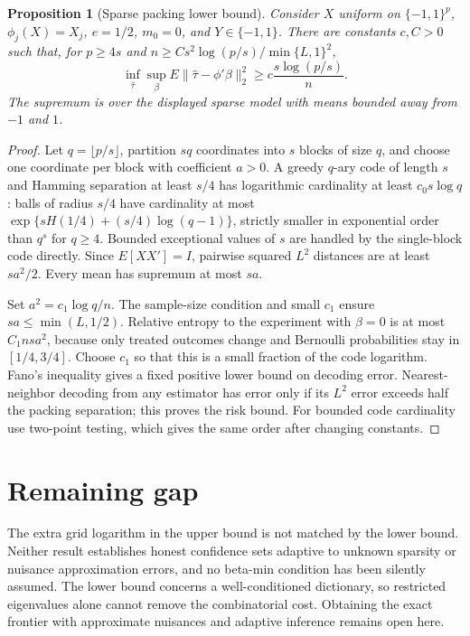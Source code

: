 \documentclass[11pt]{article}
\newtheorem{proposition}[theorem]{Proposition}
\theoremstyle{remark}
\begin{document}
\begin{proposition}[Sparse packing lower bound]
Consider $X$ uniform on $\{-1,1\}^p$, $\phi_j(X)=X_j$, $e=1/2$, $m_0=0$, and $Y\in\{-1,1\}$. There are constants $c,C>0$ such that, for $p\ge4s$ and
$n\ge C s^2\log(p/s)/\min\{L,1\}^2$,
\[
 \inf_{\widehat\tau}\sup_{\beta}
 E\|\widehat\tau-\phi'\beta\|_2^2
 \ge c\frac{s\log(p/s)}n.
\]
The supremum is over the displayed sparse model with means bounded away from $-1$ and $1$.
\end{proposition}
\begin{proof}
Let $q=\lfloor p/s\rfloor$, partition $sq$ coordinates into $s$ blocks of size $q$, and choose one coordinate per block with coefficient $a>0$. A greedy $q$-ary code of length $s$ and Hamming separation at least $s/4$ has logarithmic cardinality at least $c_0s\log q$: balls of radius $s/4$ have cardinality at most $\exp\{sH(1/4)+(s/4)\log(q-1)\}$, strictly smaller in exponential order than $q^s$ for $q\ge4$. Bounded exceptional values of $s$ are handled by the single-block code directly. Since $E[XX']=I$, pairwise squared $L^2$ distances are at least $sa^2/2$. Every mean has supremum at most $sa$.

Set $a^2=c_1\log q/n$. The sample-size condition and small $c_1$ ensure $sa\le\min(L,1/2)$. Relative entropy to the experiment with $\beta=0$ is at most $C_1nsa^2$, because only treated outcomes change and Bernoulli probabilities stay in $[1/4,3/4]$. Choose $c_1$ so that this is a small fraction of the code logarithm. Fano's inequality gives a fixed positive lower bound on decoding error. Nearest-neighbor decoding from any estimator has error only if its $L^2$ error exceeds half the packing separation; this proves the risk bound. For bounded code cardinality use two-point testing, which gives the same order after changing constants.
\end{proof}

\section*{Remaining gap}
The extra grid logarithm in the upper bound is not matched by the lower bound. Neither result establishes honest confidence sets adaptive to unknown sparsity or nuisance approximation errors, and no beta-min condition has been silently assumed. The lower bound concerns a well-conditioned dictionary, so restricted eigenvalues alone cannot remove the combinatorial cost. Obtaining the exact frontier with approximate nuisances and adaptive inference remains open here.
\end{document}
